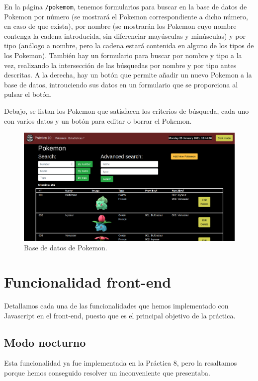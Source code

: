 \documentclass{article}
\begin{document}
En la página \texttt{/pokemom}, tenemos formularios para buscar en la
base de datos de Pokemon por número (se mostrará el Pokemon
correspondiente a dicho número, en caso de que exista), por nombre (se
mostrarán los Pokemon cuyo nombre contenga la cadena introducida, sin
diferenciar mayúsculas y minúsculas) y por tipo (análogo a nombre,
pero la cadena estará contenida en alguno de los tipos de los
Pokemon). También hay un formulario para buscar por nombre y tipo a la
vez, realizando la intersección de las búsquedas por nombre y por tipo
antes descritas. A la derecha, hay un botón que permite añadir un
nuevo Pokemon a la base de datos, introuciendo sus datos en un
formulario que se proporciona al pulsar el botón.

Debajo, se listan los Pokemon que satisfacen los criterios de
búsqueda, cada uno con varios datos y un botón para editar o borrar el
Pokemon.

\begin{figure}[H]
  \centering
  \includegraphics[width=180mm]{imgs/pokemon}
  \caption{Base de datos de Pokemon.}
  \label{fig:pokemon}
\end{figure}

\section{Funcionalidad front-end}
Detallamos cada una de las funcionalidades que hemos implementado con
Javascript en el front-end, puesto que es el principal objetivo de la
práctica.

\subsection{Modo nocturno}

Esta funcionalidad ya fue implementada en la Práctica 8, pero la
resaltamos porque hemos conseguido resolver un inconveniente que
presentaba.
\end{document}
